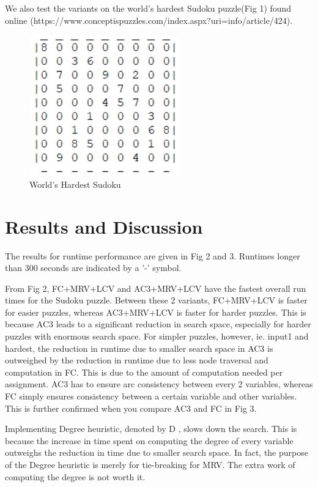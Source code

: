 \documentclass[runningheads]{llncs}
\begin{document}
We also test the variants on the world's hardest Sudoku puzzle(Fig 1) found online (https://www.conceptispuzzles.com/index.aspx?uri=info/article/424).

\begin{figure}
\centering
\includegraphics[scale=0.9]{hardest_sudoku.png}
\caption{World's Hardest Sudoku}
\label{Figure 1}
\end{figure}

\section{Results and Discussion}

 The results for runtime performance are given in Fig 2 and 3. Runtimes longer than 300 seconds are indicated by a '-' symbol.

From Fig 2, FC+MRV+LCV and AC3+MRV+LCV have the fastest overall run times for the Sudoku puzzle. Between these 2 variants, FC+MRV+LCV is faster for easier puzzles, whereas AC3+MRV+LCV is faster for harder puzzles. This is because AC3 leads to a significant reduction in search space, especially for harder puzzles with enormous search space. For simpler puzzles, however, ie. input1 and hardest, the reduction in runtime due to smaller search space in AC3 is outweighed by the reduction in runtime due to less node traversal and computation in FC. This is due to the amount of computation needed per assignment. AC3 has to ensure arc consistency between every 2 variables, whereas FC simply ensures consistency between a certain variable and other variables. This is further confirmed when you compare AC3 and FC in Fig 3.

Implementing Degree heuristic, denoted by D , slows down the search. This is because the increase in time spent on computing the degree of every variable outweighs the reduction in time due to smaller search space. In fact, the purpose of the Degree heuristic is merely for tie-breaking for MRV. The extra work of computing the degree is not worth it. 
\end{document}
